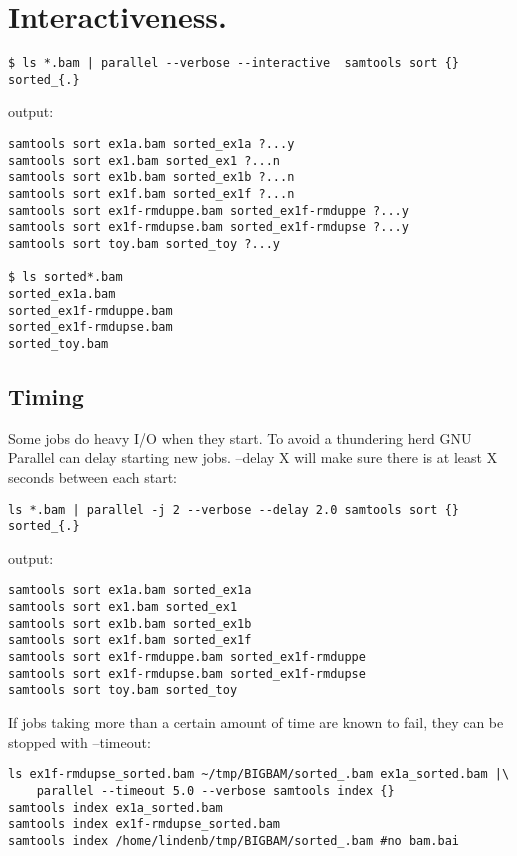 \documentclass{article}
\begin{document}
\section{Interactiveness.}

\begin{lstlisting}
$ ls *.bam | parallel --verbose --interactive  samtools sort {} sorted_{.}
\end{lstlisting}
output:
\begin{lstlisting}
samtools sort ex1a.bam sorted_ex1a ?...y
samtools sort ex1.bam sorted_ex1 ?...n
samtools sort ex1b.bam sorted_ex1b ?...n
samtools sort ex1f.bam sorted_ex1f ?...n
samtools sort ex1f-rmduppe.bam sorted_ex1f-rmduppe ?...y
samtools sort ex1f-rmdupse.bam sorted_ex1f-rmdupse ?...y
samtools sort toy.bam sorted_toy ?...y

$ ls sorted*.bam
sorted_ex1a.bam
sorted_ex1f-rmduppe.bam
sorted_ex1f-rmdupse.bam
sorted_toy.bam
\end{lstlisting}



\subsection{Timing}
Some jobs do heavy I/O when they start. To avoid a thundering herd GNU Parallel can delay starting new jobs. --delay X will make sure there is at least X seconds between each start:
\begin{lstlisting}
ls *.bam | parallel -j 2 --verbose --delay 2.0 samtools sort {} sorted_{.}
\end{lstlisting}
output:
\begin{lstlisting}
samtools sort ex1a.bam sorted_ex1a
samtools sort ex1.bam sorted_ex1
samtools sort ex1b.bam sorted_ex1b
samtools sort ex1f.bam sorted_ex1f
samtools sort ex1f-rmduppe.bam sorted_ex1f-rmduppe
samtools sort ex1f-rmdupse.bam sorted_ex1f-rmdupse
samtools sort toy.bam sorted_toy
\end{lstlisting}
If jobs taking more than a certain amount of time are known to fail, they can be stopped with --timeout:
\begin{lstlisting}
ls ex1f-rmdupse_sorted.bam ~/tmp/BIGBAM/sorted_.bam ex1a_sorted.bam |\
	parallel --timeout 5.0 --verbose samtools index {} 
samtools index ex1a_sorted.bam
samtools index ex1f-rmdupse_sorted.bam
samtools index /home/lindenb/tmp/BIGBAM/sorted_.bam #no bam.bai
\end{lstlisting}
\end{document}
